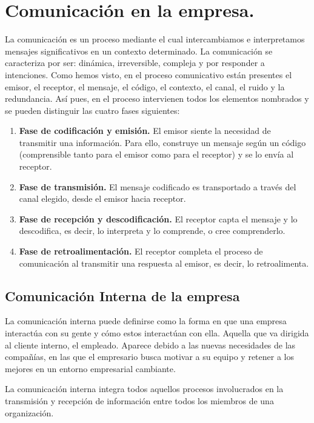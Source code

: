 \newpage
\section{Comunicación en la empresa.}

La comunicación es un proceso mediante el cual intercambiamos e	
interpretamos mensajes significativos	en	un	contexto	determinado.	La	
comunicación se caracteriza	 por ser: dinámica, irreversible, compleja	
y	por	responder	a	intenciones.
Como	hemos	visto,	en	el	proceso	comunicativo	están	presentes	el	emisor,	el	receptor,	el	mensaje,	el	código,	el	contexto,	el	canal,	el	ruido	y	la	
redundancia.	Así	pues,	en	el	proceso	intervienen	 todos	los	elementos	
nombrados	y	se	pueden	distinguir	las	cuatro	fases	siguientes:

\begin{enumerate}
    \item \textbf{Fase de codificación y emisión.}	 El	emisor	siente	la	necesidad	de	
    transmitir	una	información.	Para	ello,	construye	un	mensaje	según	un	
    código	(comprensible	tanto	para	el	emisor	como	para	el	receptor)	y	
    se	lo	envía	al	receptor.

    \item \textbf{Fase de transmisión.} El	mensaje	codificado	es	transportado	a	través	del	canal	elegido,	desde	el	emisor	hacia	receptor.
    \item \textbf{Fase de recepción y descodificación.}	 El	receptor	capta	el	mensaje	
    y	lo	descodifica,	es	decir,	lo	interpreta	y	lo	comprende,	o	cree	comprenderlo.
    \item \textbf{Fase de retroalimentación.} El receptor completa el proceso de
    comunicación	 al	 transmitir	 una	 respuesta	 al	 emisor,	 es	 decir,	 lo	retroalimenta.
\end{enumerate}

\subsection{Comunicación Interna de la empresa}
La comunicación interna puede definirse como  la forma en que una empresa interactúa
con su gente y cómo estos interactúan con ella. Aquella que va dirigida al cliente
interno, el empleado. Aparece debido a las nuevas necesidades de las compañías,
en las que el empresario busca motivar a su equipo y retener a los mejores en un
entorno empresarial cambiante.  

La comunicación interna integra todos aquellos procesos involucrados en la
transmisión y recepción de información entre todos los miembros de una organización.

